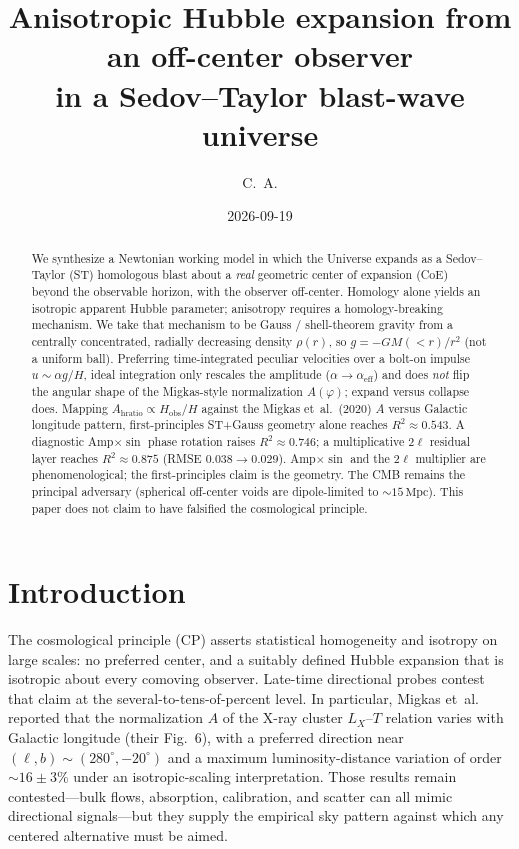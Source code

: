 \documentclass[11pt,a4paper]{article}
\title{Anisotropic Hubble expansion from an off-center observer\\
in a Sedov--Taylor blast-wave universe}
\author{C.\ A.}
\date{2026-09-19}
\begin{document}
\maketitle

\begin{abstract}
We synthesize a Newtonian working model in which the Universe expands as a
Sedov--Taylor (ST) homologous blast about a \emph{real} geometric center of
expansion (CoE) beyond the observable horizon, with the observer off-center.
Homology alone yields an isotropic apparent Hubble parameter; anisotropy
requires a homology-breaking mechanism. We take that mechanism to be Gauss /
shell-theorem gravity from a centrally concentrated, radially decreasing
density $\rho(r)$, so $g=-GM(<r)/r^2$ (not a uniform ball). Preferring
time-integrated peculiar velocities over a bolt-on impulse $u\sim\alpha g/H$,
ideal integration only rescales the amplitude
($\alpha\to\alpha_{\mathrm{eff}}$) and does \emph{not} flip the angular shape
of the Migkas-style normalization $A(\varphi)$; expand versus collapse does.
Mapping $A_{\mathrm{hratio}}\propto H_{\mathrm{obs}}/H$ against the Migkas
et~al.\ (2020) $A$ versus Galactic longitude pattern, first-principles
ST+Gauss geometry alone reaches $R^2\approx0.543$. A diagnostic
Amp$\times\sin$ phase rotation raises $R^2\approx0.746$; a multiplicative
$2\ell$ residual layer reaches $R^2\approx0.875$ (RMSE $0.038\to0.029$).
Amp$\times\sin$ and the $2\ell$ multiplier are phenomenological; the
first-principles claim is the geometry. The CMB remains the principal
adversary (spherical off-center voids are dipole-limited to
$\sim15\,\mathrm{Mpc}$). This paper does not claim to have falsified the
cosmological principle.
\end{abstract}

\tableofcontents
\newpage

\section{Introduction}
\label{sec:intro}

The cosmological principle (CP) asserts statistical homogeneity and isotropy on
large scales: no preferred center, and a suitably defined Hubble expansion that
is isotropic about every comoving observer. Late-time directional probes contest
that claim at the several-to-tens-of-percent level. In particular, Migkas
et~al.~\citep{Migkas2020} reported that the normalization $A$ of the X-ray
cluster $L_X$--$T$ relation varies with Galactic longitude (their Fig.~6), with
a preferred direction near $(\ell,b)\sim(280^\circ,-20^\circ)$ and a maximum
luminosity-distance variation of order $\sim16\pm3\%$ under an isotropic-scaling
interpretation. Those results remain contested---bulk flows, absorption,
calibration, and scatter can all mimic directional signals---but they supply the
empirical sky pattern against which any centered alternative must be aimed.
\end{document}
